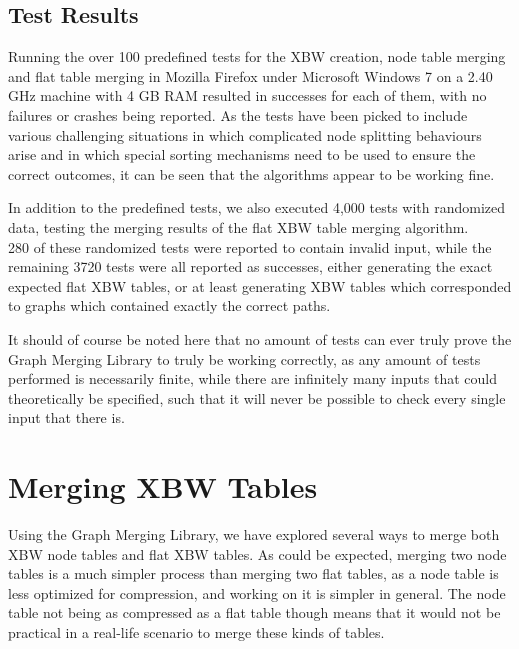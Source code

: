 \documentclass[a4paper,12pt,twoside,BCOR=10mm]{scrbook}
\begin{document}
\subsection{Test Results}

Running the over 100 predefined tests for the XBW creation, node table merging
and flat table merging in Mozilla Firefox under Microsoft Windows 7 on a 2.40 GHz machine with 4 GB RAM
resulted in successes for each of them,
with no failures or crashes being reported.
As the tests have been picked to include various challenging situations
in which complicated node splitting behaviours arise and in which
special sorting mechanisms need to be used to ensure the correct outcomes,
it can be seen that the algorithms appear to be working fine.

In addition to the predefined tests, we also executed 4,000 tests with randomized data,
testing the merging results of the flat XBW table merging algorithm. \\
280 of these randomized tests were reported to contain invalid input,
while the remaining 3720 tests were all reported as successes,
either generating the exact expected flat XBW tables, or at least
generating XBW tables which corresponded to graphs which contained exactly the
correct paths.


It should of course be noted here that no amount of tests can ever
truly prove the Graph Merging Library to truly be working correctly,
as any amount of tests performed is necessarily finite, while there are
infinitely many inputs that could theoretically be specified,
such that it will never be possible to check every single input that there is.

\section{Merging XBW Tables}
%

Using the Graph Merging Library, we have explored several ways to merge both XBW node tables and flat XBW tables.
As could be expected, merging two node tables is a much simpler process than merging two flat tables,
as a node table is less optimized for compression, and working on it is simpler in general.
The node table not being as compressed as a flat table though means
that it would not be practical in a real-life scenario to merge these kinds of tables.
\end{document}
